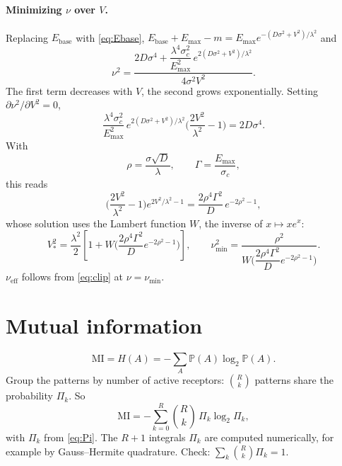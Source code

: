 \documentclass[11pt,a4paper]{article}
\newcommand{\PP}{\mathbb{P}}
\newcommand{\Ebase}{E_{\mathrm{base}}}
\newcommand{\Emax}{E_{\mathrm{max}}}
\newcommand{\nueff}{\nu_{\mathrm{eff}}}
\begin{document}
\paragraph{Minimizing $\nu$ over $V$.} Replacing $\Ebase$ with \eqref{eq:Ebase},
$\Ebase+\Emax-m=\Emax e^{-(D\sigma^2+V^2)/\lambda^2}$ and
\begin{equation}
  \boxed{\;\nu^2=\frac{2D\sigma^4+\dfrac{\lambda^4\sigma_c^2}{\Emax^2}
  \,e^{2(D\sigma^2+V^2)/\lambda^2}}{4\sigma^2V^2}.\;}
\end{equation}
The first term decreases with $V$, the second grows exponentially. Setting
$\partial\nu^2/\partial V^2=0$,
\begin{equation}
  \frac{\lambda^4\sigma_c^2}{\Emax^2}\,e^{2(D\sigma^2+V^2)/\lambda^2}
  \Big(\frac{2V^2}{\lambda^2}-1\Big)=2D\sigma^4 .
\end{equation}
With
\begin{equation}
  \rho=\frac{\sigma\sqrt D}{\lambda},
  \qquad
  \Gamma=\frac{\Emax}{\sigma_c},
\end{equation}
this reads
\begin{equation}
  \Big(\frac{2V^2}{\lambda^2}-1\Big)e^{2V^2/\lambda^2-1}
  =\frac{2\rho^4\Gamma^2}{D}\,e^{-2\rho^2-1},
\end{equation}
whose solution uses the Lambert function $W$, the inverse of $x\mapsto xe^x$:
\begin{equation}
  \boxed{\;V_*^2=\frac{\lambda^2}{2}\left[1+W\Big(\frac{2\rho^4\Gamma^2}{D}e^{-2\rho^2-1}\Big)\right],
  \qquad
  \nu_{\min}^2=\frac{\rho^2}{W\Big(\dfrac{2\rho^4\Gamma^2}{D}e^{-2\rho^2-1}\Big)}.\;}
\end{equation}
$\nueff$ follows from \eqref{eq:clip} at $\nu=\nu_{\min}$.

\section{Mutual information}

\begin{equation}
  \mathrm{MI}=H(A)=-\sum_A\PP(A)\log_2\PP(A).
\end{equation}
Group the patterns by number of active receptors: $\binom Rk$ patterns share the
probability $\Pi_k$. So
\begin{equation}
  \boxed{\;\mathrm{MI}=-\sum_{k=0}^{R}\binom Rk\,\Pi_k\log_2\Pi_k ,\;}
\end{equation}
with $\Pi_k$ from \eqref{eq:Pi}. The $R+1$ integrals $\Pi_k$ are computed numerically, for
example by Gauss--Hermite quadrature. Check: $\sum_k\binom Rk\Pi_k=1$.
\end{document}
